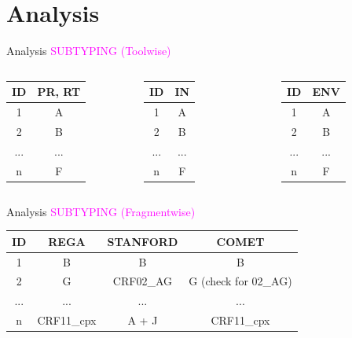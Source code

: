 \documentclass{beamer}
\begin{document}
\section{Analysis}
\begin{frame}{Analysis}
\centering
\textcolor{magenta}{SUBTYPING (Toolwise)}
\vspace{10pt}
\centering
\begin{columns}[onlytextwidth]
\begin{tabular}{|c|c|}
\hline 
ID & PR, RT \\ 
\hline 
1 & A \\ 
\hline 
2  & B \\ 
\hline 
... & ... \\ 
\hline 
n & F \\ 
\hline 
\end{tabular}
\begin{tabular}{|c|c|}
\hline 
ID & IN \\ 
\hline 
1 & A \\ 
\hline 
2  & B \\ 
\hline 
... & ... \\ 
\hline 
n & F \\ 
\hline 
\end{tabular}
\begin{tabular}{|c|c|}
\hline 
ID & ENV \\ 
\hline 
1 & A \\ 
\hline 
2  & B \\ 
\hline 
... & ... \\ 
\hline 
n & F \\ 
\hline 
\end{tabular}
\end{columns}
\end{frame}


\begin{frame}{Analysis}
\centering
\textcolor{magenta}{SUBTYPING (Fragmentwise)}\\
\vspace{10pt}
\begin{tabular}{|c|c|c|c|}
 \hline 
 ID & REGA & STANFORD & COMET \\ 
 \hline 
 1 & B & B & B \\ 
 \hline 
 2 & G & CRF02\_AG & G (check for 02\_AG) \\ 
 \hline 
 ... & ... & ... & ... \\ 
 \hline 
 n & CRF11\_cpx & A + J  & CRF11\_cpx \\ 
 \hline 
 \end{tabular} 
\end{frame}
\end{document}
